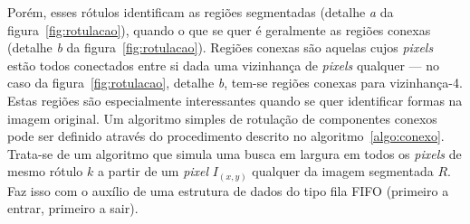 \begin{figure}[ht!]
\begin{center}
\fonteminha

\end{center}
\end{figure}


Porém, esses rótulos identificam as regiões segmentadas (detalhe
\textit{a} da figura~\ref{fig:rotulacao}), quando o que se quer é
geralmente as regiões conexas (detalhe \textit{b} da
figura~\ref{fig:rotulacao}). Regiões conexas são aquelas cujos \textit{pixels}
estão todos conectados entre si dada uma vizinhança de \textit{pixels}
qualquer --- no caso da figura~\ref{fig:rotulacao}, detalhe
\textit{b}, tem-se regiões conexas para vizinhança-4. Estas regiões
são especialmente interessantes quando se quer identificar formas
na imagem original. Um algoritmo simples de rotulação de componentes
conexos pode ser definido através do procedimento descrito no
algoritmo~\ref{algo:conexo}. Trata-se de um algoritmo que simula uma
busca em largura em todos os \textit{pixels} de mesmo rótulo $k$ a partir de um
\textit{pixel} $I_{(x,y)}$ qualquer da imagem segmentada $R$. Faz isso com o
auxílio de uma estrutura de dados do tipo fila FIFO (primeiro a
entrar, primeiro a sair).

